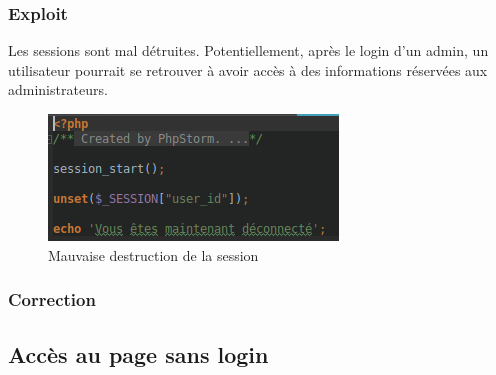 \documentclass[12pt]{article}
\begin{document}
\subsubsection{Exploit}
Les sessions sont mal détruites. Potentiellement, après le login d'un admin, un utilisateur pourrait se retrouver à avoir accès à des informations réservées aux administrateurs.
\begin{figure}[H]
\centering
\includegraphics[width=\linewidth]{images/unset.png}
\caption{Mauvaise destruction de la session}
\end{figure}


\subsubsection{Correction}


\subsection{Accès au page sans login}
\end{document}

